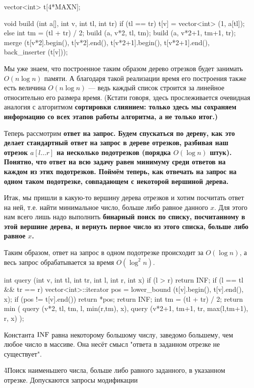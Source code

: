 \code
vector<int> t[4*MAXN];

void build (int a[], int v, int tl, int tr) {
	if (tl == tr)
		t[v] = vector<int> (1, a[tl]);
	else {
		int tm = (tl + tr) / 2;
		build (a, v*2, tl, tm);
		build (a, v*2+1, tm+1, tr);
		merge (t[v*2].begin(), t[v*2].end(), t[v*2+1].begin(), t[v*2+1].end(),
			back_inserter (t[v]));
	}
}
\endcode

Мы уже знаем, что построенное таким образом дерево отрезков будет занимать $O (n \log n)$ памяти. А благодаря такой реализации время его построения также есть величина $O (n \log n)$ --- ведь каждый список строится за линейное относительно его размера время. (Кстати говоря, здесь прослеживается очевидная аналогия с алгоритмом \bf{сортировки слиянием}: только здесь мы сохраняем информацию со всех этапов работы алгоритма, а не только итог.)

Теперь рассмотрим \bf{ответ на запрос}. Будем спускаться по дереву, как это делает стандартный ответ на запрос в дереве отрезков, разбивая наш отрезок $a[l \ldots r]$ на несколько подотрезков (порядка $O (\log n)$ штук). Понятно, что ответ на всю задачу равен минимуму среди ответов на каждом из этих подотрезков. Поймём теперь, как отвечать на запрос на одном таком подотрезке, совпадающем с некоторой вершиной дерева.

Итак, мы пришли в какую-то вершину дерева отрезков и хотим посчитать ответ на ней, т.е. найти минимальное число, больше либо равное данного $x$. Для этого нам всего лишь надо выполнить \bf{бинарный поиск} по списку, посчитанному в этой вершине дерева, и вернуть первое число из этого списка, больше либо равное $x$.

Таким образом, ответ на запрос в одном подотрезке происходит за $O (\log n)$, а весь запрос обрабатывается за время $O (\log^2 n)$.

\code
int query (int v, int tl, int tr, int l, int r, int x) {
	if (l > r)
		return INF;
	if (l == tl && tr == r) {
		vector<int>::iterator pos = lower_bound (t[v].begin(), t[v].end(), x);
		if (pos != t[v].end())
			return *pos;
		return INF;
	}
	int tm = (tl + tr) / 2;
	return min (
		query (v*2, tl, tm, l, min(r,tm), x),
		query (v*2+1, tm+1, tr, max(l,tm+1), r, x)
	);
}
\endcode

Константа $\rm INF$ равна некоторому большому числу, заведомо большему, чем любое число в массиве. Она несёт смысл "ответа в заданном отрезке не существует".

\h4{Поиск наименьшего числа, больше либо равного заданного, в указанном отрезке. Допускаются запросы модификации}

